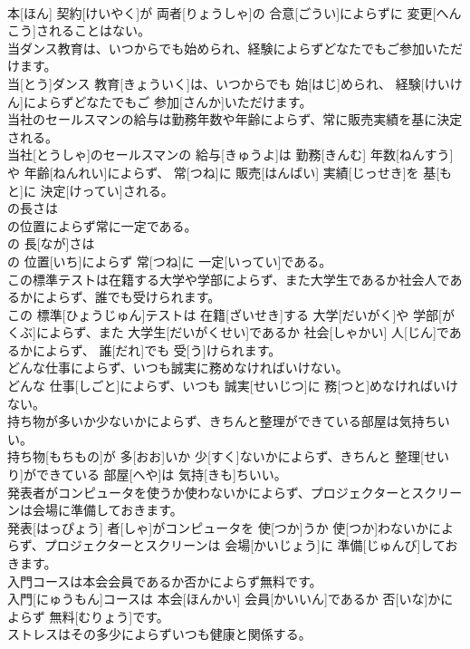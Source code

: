 \documentclass[8pt]{extreport}
\begin{document}
\begin{CJK}{UTF8}{min}
\\	本[ほん] 契約[けいやく]が 両者[りょうしゃ]の 合意[ごうい]によらずに 変更[へんこう]されることはない。
\\	当ダンス教育は、いつからでも始められ、経験によらずどなたでもご参加いただけます。	
\\	当[とう]ダンス 教育[きょういく]は、いつからでも 始[はじ]められ、 経験[けいけん]によらずどなたでもご 参加[さんか]いただけます。
\\	当社のセールスマンの給与は勤務年数や年齢によらず、常に販売実績を基に決定される。	
\\	当社[とうしゃ]のセールスマンの 給与[きゅうよ]は 勤務[きんむ] 年数[ねんすう]や 年齢[ねんれい]によらず、 常[つね]に 販売[はんばい] 実績[じっせき]を 基[もと]に 決定[けってい]される。
\\	の長さは
\\	の位置によらず常に一定である。	
\\	の 長[なが]さは 
\\	の 位置[いち]によらず 常[つね]に 一定[いってい]である。
\\	この標準テストは在籍する大学や学部によらず、また大学生であるか社会人であるかによらず、誰でも受けられます。	
\\	この 標準[ひょうじゅん]テストは 在籍[ざいせき]する 大学[だいがく]や 学部[がくぶ]によらず、また 大学生[だいがくせい]であるか 社会[しゃかい] 人[じん]であるかによらず、 誰[だれ]でも 受[う]けられます。
\\	どんな仕事によらず、いつも誠実に務めなければいけない。	
\\	どんな 仕事[しごと]によらず、いつも 誠実[せいじつ]に 務[つと]めなければいけない。
\\	持ち物が多いか少ないかによらず、きちんと整理ができている部屋は気持ちいい。	
\\	持ち物[もちもの]が 多[おお]いか 少[すく]ないかによらず、きちんと 整理[せいり]ができている 部屋[へや]は 気持[きも]ちいい。
\\	発表者がコンピュータを使うか使わないかによらず、プロジェクターとスクリーンは会場に準備しておきます。	
\\	発表[はっぴょう] 者[しゃ]がコンピュータを 使[つか]うか 使[つか]わないかによらず、プロジェクターとスクリーンは 会場[かいじょう]に 準備[じゅんび]しておきます。
\\	入門コースは本会会員であるか否かによらず無料です。	
\\	入門[にゅうもん]コースは 本会[ほんかい] 会員[かいいん]であるか 否[いな]かによらず 無料[むりょう]です。
\\	ストレスはその多少によらずいつも健康と関係する。	

\end{CJK}
\end{document}

